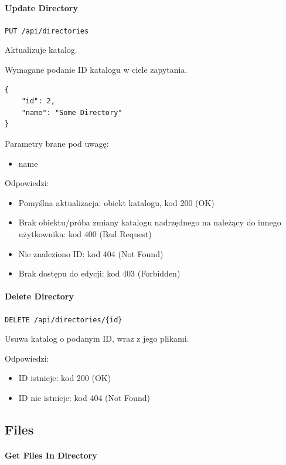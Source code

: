 \documentclass[a4paper,twoside,12pt]{book}
\begin{document}
\paragraph{Update Directory}

\texttt{PUT /api/directories}

Aktualizuje katalog.

Wymagane podanie ID katalogu w ciele zapytania.

\begin{verbatim}
{
    "id": 2,
    "name": "Some Directory"
}
\end{verbatim}

Parametry brane pod uwagę: 
\begin{itemize}
	\item  name
\end{itemize}

Odpowiedzi: 
\begin{itemize}
	\item Pomyślna aktualizacja: obiekt katalogu, kod 200 (OK)
	\item Brak obiektu/próba zmiany katalogu nadrzędnego na należący do innego użytkownika: kod 400 (Bad Request) 
	\item Nie znaleziono ID: kod 404 (Not Found) 
	\item Brak dostępu do edycji: kod 403 (Forbidden)
\end{itemize}

\paragraph{Delete Directory}

\texttt{DELETE /api/directories/\{id\}}

Usuwa katalog o podanym ID, wraz z jego plikami.

Odpowiedzi: 
\begin{itemize}
	\item ID istnieje: kod 200 (OK) 
	\item ID nie istnieje: kod 404 (Not Found)
\end{itemize}

\subsection{Files}

\paragraph{Get Files In Directory}
\end{document}
